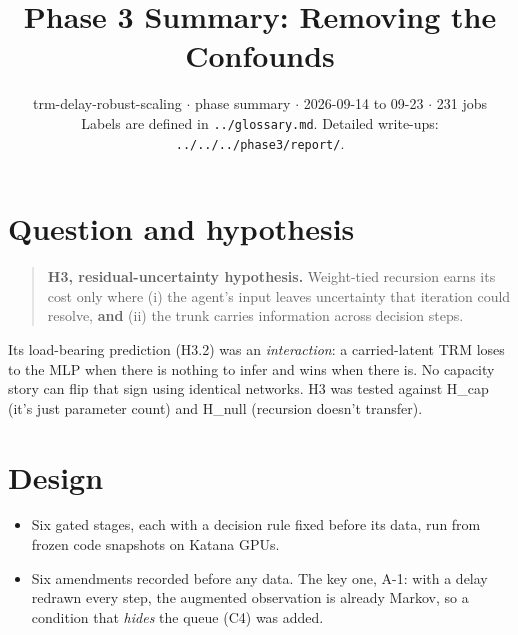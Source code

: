 \documentclass[11pt]{article}
\title{Phase 3 Summary: Removing the Confounds}
\author{}
\date{trm-delay-robust-scaling $\cdot$ phase summary $\cdot$ 2026-09-14 to 09-23 $\cdot$ 231 jobs\\[2pt]Labels are defined in \texttt{.\allowbreak{}.\allowbreak{}/\allowbreak{}glossary.\allowbreak{}md}. Detailed write-ups: \texttt{.\allowbreak{}.\allowbreak{}/\allowbreak{}.\allowbreak{}.\allowbreak{}/\allowbreak{}.\allowbreak{}.\allowbreak{}/\allowbreak{}phase3/\allowbreak{}report/\allowbreak{}}.}
\begin{document}
\maketitle
\section*{Question and hypothesis}



\begin{quote}\textbf{H3, residual-uncertainty hypothesis.} Weight-tied recursion earns its cost only where (i) the agent's input leaves uncertainty that iteration could resolve, \textbf{and} (ii) the trunk carries information across decision steps.\end{quote}



Its load-bearing prediction (H3.2) was an \emph{interaction}: a carried-latent TRM loses to the MLP when there is nothing to infer and wins when there is. No capacity story can flip that sign using identical networks. H3 was tested against H\_cap (it's just parameter count) and H\_null (recursion doesn't transfer).



\section*{Design}



\begin{itemize}
\item Six gated stages, each with a decision rule fixed before its data, run from frozen code snapshots on Katana GPUs.
\item Six amendments recorded before any data. The key one, A-1: with a delay redrawn every step, the augmented observation is already Markov, so a condition that \emph{hides} the queue (C4) was added.
\end{itemize}
\end{document}
